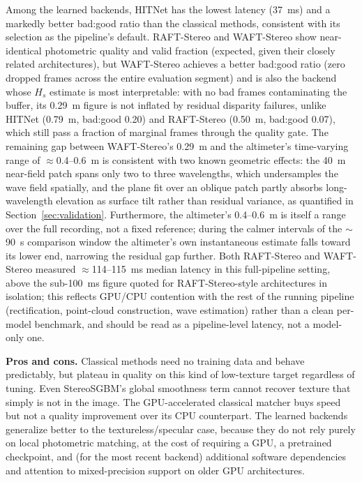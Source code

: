 Among the learned backends, HITNet has the lowest latency (37~ms) and a markedly better bad:good ratio than the classical methods, consistent with its selection as the pipeline's default. RAFT-Stereo and WAFT-Stereo show near-identical photometric quality and valid fraction (expected, given their closely related architectures), but WAFT-Stereo achieves a better bad:good ratio (zero dropped frames across the entire evaluation segment) and is also the backend whose $H_s$ estimate is most interpretable: with no bad frames contaminating the buffer, its 0.29~m figure is not inflated by residual disparity failures, unlike HITNet (0.79~m, bad:good 0.20) and RAFT-Stereo (0.50~m, bad:good 0.07), which still pass a fraction of marginal frames through the quality gate. The remaining gap between WAFT-Stereo's 0.29~m and the altimeter's time-varying range of $\approx$0.4--0.6~m is consistent with two known geometric effects: the 40~m near-field patch spans only two to three wavelengths, which undersamples the wave field spatially, and the plane fit over an oblique patch partly absorbs long-wavelength elevation as surface tilt rather than residual variance, as quantified in Section~\ref{sec:validation}. Furthermore, the altimeter's 0.4--0.6~m is itself a range over the full recording, not a fixed reference; during the calmer intervals of the $\sim$90~s comparison window the altimeter's own instantaneous estimate falls toward its lower end, narrowing the residual gap further. Both RAFT-Stereo and WAFT-Stereo measured $\approx$114--115~ms median latency in this full-pipeline setting, above the sub-100~ms figure quoted for RAFT-Stereo-style architectures in isolation; this reflects GPU/CPU contention with the rest of the running pipeline (rectification, point-cloud construction, wave estimation) rather than a clean per-model benchmark, and should be read as a pipeline-level latency, not a model-only one.

\textbf{Pros and cons.} Classical methods need no training data and behave predictably, but plateau in quality on this kind of low-texture target regardless of tuning. Even StereoSGBM's global smoothness term cannot recover texture that simply is not in the image. The GPU-accelerated classical matcher buys speed but not a quality improvement over its CPU counterpart. The learned backends generalize better to the textureless/specular case, because they do not rely purely on local photometric matching, at the cost of requiring a GPU, a pretrained checkpoint, and (for the most recent backend) additional software dependencies and attention to mixed-precision support on older GPU architectures.


